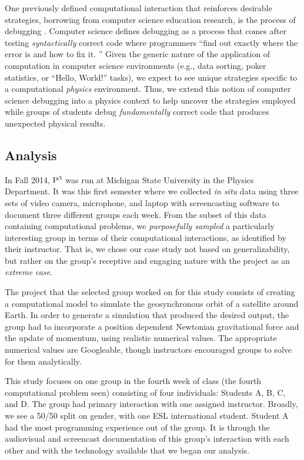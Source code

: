 \documentclass{msuphddissertation}
\begin{document}
\begin{doublespace}
One previously defined computational interaction that reinforces desirable strategies, borrowing from computer science education research, is the process of debugging \cite{Fitzgerald2008}.  Computer science defines debugging as a process that comes after testing \emph{syntactically} correct code where programmers ``find out exactly where the error is and how to fix it. \cite{McCauley2008}''  Given the generic nature of the application of computation in computer science environments (e.g., data sorting, poker statistics, or ``Hello, World!'' tasks), we expect to see unique strategies specific to a computational \emph{physics} environment.  Thus, we extend this notion of computer science debugging into a physics context to help uncover the strategies employed while groups of students debug \emph{fundamentally} correct code that produces unexpected physical results.

\subsection{Analysis}

In Fall 2014, ${\rm P}^{3}$ was run at Michigan State University in the Physics Department.  It was this first semester where we collected \emph{in situ} data using three sets of video camera, microphone, and laptop with screencasting software to document three different groups each week.  From the subset of this data containing computational problems, we \emph{purposefully sampled} a particularly interesting group in terms of their computational interactions, as identified by their instructor.  That is, we chose our case study not based on generalizability, but rather on the group's receptive and engaging nature with the project as an \emph{extreme case}.\cite{Flyvbjerg2006}

The project that the selected group worked on for this study consists of creating a computational model to simulate the geosynchronous orbit of a satellite around Earth.  In order to generate a simulation that produced the desired output, the group had to incorporate a position dependent Newtonian gravitational force and the update of momentum, using realistic numerical values.  The appropriate numerical values are Googleable, though instructors encouraged groups to solve for them analytically.

This study focuses on one group in the fourth week of class (the fourth computational problem seen) consisting of four individuals: Students A, B, C, and D.  The group had primary interaction with one assigned instructor.  Broadly, we see a 50/50 split on gender, with one ESL international student.  Student A had the most programming experience out of the group.  It is through the audiovisual and screencast documentation of this group's interaction with each other and with the technology available that we began our analysis.


\end{doublespace}
\end{document}

